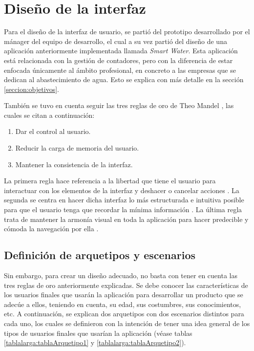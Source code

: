\documentclass[pdftex,11pt,a4paper]{book}
\begin{document}
\section{Diseño de la interfaz} \label{seccion:disenyo-interfaz}

Para el diseño de la interfaz de usuario, se partió del prototipo desarrollado por el mánager del equipo de desarrollo, el cual a su vez partió del diseño de una aplicación anteriormente implementada llamada \textit{Smart Water}. Esta aplicación está relacionada con la gestión de contadores, pero con la diferencia de estar enfocada únicamente al ámbito profesional, en concreto a las empresas que se dedican al abastecimiento de agua. Esto se explica con más detalle en la sección \ref{seccion:objetivos}.

También se tuvo en cuenta seguir las tres reglas de oro de Theo Mandel \cite{bib:3ReglasOro}, las cuales se citan a continuación:
\vspace{-4mm}
\begin{enumerate}
\addtolength{\itemsep}{-3mm}
\item Dar el control al usuario.
\item Reducir la carga de memoria del usuario.
\item Mantener la consistencia de la interfaz.
\end{enumerate}

La primera regla hace referencia a la libertad que tiene el usuario para interactuar con los elementos de la interfaz y deshacer o cancelar acciones \cite{bib:3ReglasOro}. La segunda se centra en hacer dicha interfaz lo más estructurada e intuitiva posible para que el usuario tenga que recordar la mínima información \cite{bib:3ReglasOro}.  La última regla trata de mantener la armonía visual en toda la aplicación para hacer predecible y cómoda la navegación por ella \cite{bib:3ReglasOro}.


\subsection{Definición de arquetipos y escenarios}

Sin embargo, para crear un diseño adecuado, no basta con tener en cuenta las tres reglas de oro anteriormente explicadas. Se debe conocer las características de los usuarios finales que usarán la aplicación para desarrollar un producto que se adecúe a ellos, teniendo en cuenta, su edad, sus costumbres, sus conocimientos, etc. A continuación, se explican dos arquetipos con dos escenarios distintos para cada uno, los cuales se definieron con la intención de tener una idea general de los tipos de usuarios finales que usarían la aplicación (véase tablas \ref{tablalarga:tablaArquetipo1} y \ref{tablalarga:tablaArquetipo2}). 
\end{document}
